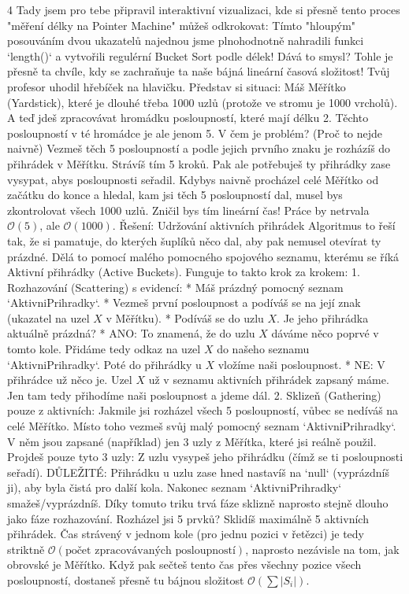 \documentclass[8pt]{extarticle}
\begin{document}
\begin{multicols*}{4}
Tady jsem pro tebe připravil interaktivní vizualizaci, kde si přesně tento proces "měření délky na Pointer Machine" můžeš odkrokovat:
Tímto "hloupým" posouváním dvou ukazatelů najednou jsme plnohodnotně nahradili funkci `length()` a vytvořili regulérní Bucket Sort podle délek! Dává to smysl?
Tohle je přesně ta chvíle, kdy se zachraňuje ta naše bájná lineární časová složitost! Tvůj profesor uhodil hřebíček na hlavičku.
Představ si situaci: Máš Měřítko (Yardstick), které je dlouhé třeba 1000 uzlů (protože ve stromu je 1000 vrcholů). A teď jdeš zpracovávat hromádku posloupností, které mají délku 2. Těchto posloupností v té hromádce je ale jenom 5.
V čem je problém? (Proč to nejde naivně)
Vezmeš těch 5 posloupností a podle jejich prvního znaku je rozházíš do přihrádek v Měřítku. Strávíš tím 5 kroků.
Pak ale potřebuješ ty přihrádky zase vysypat, abys posloupnosti seřadil. Kdybys naivně procházel celé Měřítko od začátku do konce a hledal, kam jsi těch 5 posloupností dal, musel bys zkontrolovat všech 1000 uzlů.
Zničil bys tím lineární čas! Práce by netrvala $\mathcal{O}(5)$, ale $\mathcal{O}(1000)$.
Řešení: Udržování aktivních přihrádek
Algoritmus to řeší tak, že si pamatuje, do kterých šuplíků něco dal, aby pak nemusel otevírat ty prázdné. Dělá to pomocí malého pomocného spojového seznamu, kterému se říká Aktivní přihrádky (Active Buckets).
Funguje to takto krok za krokem:
1. Rozhazování (Scattering) s evidencí:
* Máš prázdný pomocný seznam `AktivniPrihradky`.
* Vezmeš první posloupnost a podíváš se na její znak (ukazatel na uzel $X$ v Měřítku).
* Podíváš se do uzlu $X$. Je jeho přihrádka aktuálně prázdná?
* ANO: To znamená, že do uzlu $X$ dáváme něco poprvé v tomto kole. Přidáme tedy odkaz na uzel $X$ do našeho seznamu `AktivniPrihradky`. Poté do přihrádky u $X$ vložíme naši posloupnost.
* NE: V přihrádce už něco je. Uzel $X$ už v seznamu aktivních přihrádek zapsaný máme. Jen tam tedy přihodíme naši posloupnost a jdeme dál.
2. Sklizeň (Gathering) pouze z aktivních:
Jakmile jsi rozházel všech 5 posloupností, vůbec se nedíváš na celé Měřítko.
Místo toho vezmeš svůj malý pomocný seznam `AktivniPrihradky`. V něm jsou zapsané (například) jen 3 uzly z Měřítka, které jsi reálně použil.
Projdeš pouze tyto 3 uzly:
Z uzlu vysypeš jeho přihrádku (čímž se ti posloupnosti seřadí).
DŮLEŽITÉ: Přihrádku u uzlu zase hned nastavíš na `null` (vyprázdníš ji), aby byla čistá pro další kola.
Nakonec seznam `AktivniPrihradky` smažeš/vyprázdníš.
Díky tomuto triku trvá fáze sklizně naprosto stejně dlouho jako fáze rozhazování. Rozházel jsi 5 prvků? Sklidíš maximálně 5 aktivních přihrádek. Čas strávený v jednom kole (pro jednu pozici v řetězci) je tedy striktně $\mathcal{O}(\text{počet zpracovávaných posloupností})$, naprosto nezávisle na tom, jak obrovské je Měřítko.
Když pak sečteš tento čas přes všechny pozice všech posloupností, dostaneš přesně tu bájnou složitost $\mathcal{O}(\sum |S_i|)$.

\end{multicols*}
\end{document}
